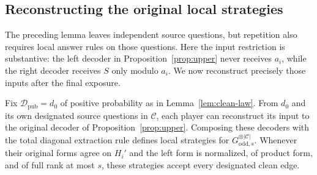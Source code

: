 \subsection{Reconstructing the original local strategies}

The preceding lemma leaves independent source questions, but repetition
also requires local answer rules on those questions.  Here the input
restriction is substantive: the left decoder in
Proposition~\ref{prop:upper} never receives $a_i$, while the right
decoder receives $S$ only modulo $a_i$.  We now reconstruct precisely
those inputs after the final exposure.

\begin{lemma}
\label{lem:reconstruction}
Fix $\mathcal D_{\mathrm{pub}}=d_0$ of positive probability as in
Lemma~\ref{lem:clean-law}.  From $d_0$ and its own designated source
questions in $\mathcal C$, each player can reconstruct its input to
the original decoder of Proposition~\ref{prop:upper}.  Composing
these decoders with the total diagonal extraction rule defines local
strategies for $G_{\mathrm{odd},s}^{\otimes |\mathcal C|}$.
Whenever their original forms agree on $H_i'$ and the left form is
normalized, of product form, and of full rank at most $s$, these
strategies accept every designated clean edge.
\end{lemma}


